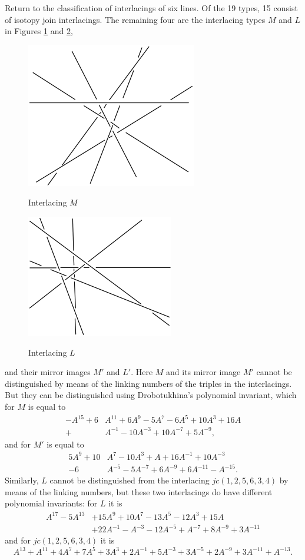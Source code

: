 \documentclass{article}
\begin{document}
Return to the classification of interlacings of six lines. Of the 19 types,
15 consist of isotopy join interlacings. The remaining four are the
interlacing types $M$ and $L$ in Figures \ref{f27} and \ref{f28}, 
\begin{figure}
{\includegraphics{imagesSkewlines/x26.png}}
\caption{Interlacing $M$}
\label{f27}
\end{figure}
\begin{figure}
{\includegraphics{imagesSkewlines/x27.png}}
\caption{Interlacing $L$}
\label{f28}
\end{figure}
\noindent
and their mirror images
$M'$ and $L'$. Here $M$ and its mirror image $M'$ cannot be distinguished by
means of the linking numbers of the triples in the interlacings. But they
can be distinguished using Drobotukhina's polynomial invariant, which for $M$
is equal to
\begin{align*}
-A^{15}+6&A^{11}+6A^9-5A^7-6A^5+10A^3+16A\\
+&A^{-1}-10A^{-3}+10A^{-7}+5A^{-9},\end{align*}
and for $M'$ is equal to
\begin{align*}
5A^9+10&A^7-10A^3+A+16A^{-1}+10A^{-3}\\
-6&A^{-5}-5A^{-7}+6A^{-9}+6A^{-11}-A^{-15}.\end{align*}
Similarly, $L$ cannot be distinguished from the interlacing $jc(1,2,5,6,3,4)$
by means of the linking numbers, but these two interlacings do have
different polynomial invariants: for $L$ it is
\begin{align*}
A^{17}-5A^{13}&+15A^{9}+10A^{7}-13A^{5}-12A^{3}+15A\\
&+22A^{-1}-A^{-3}-12A^{-5}+A^{-7}+8A^{-9}+3A^{-11}\end{align*}
and for $jc(1,2,5,6,3,4)$ it is
$$A^{13}+A^{11}+4A^{7}+7A^{5}+3A^{3}+2A^{-1}+5A^{-3}+3A^{-5}
+2A^{-9}+3A^{-11}+A^{-13}.$$
\end{document}

